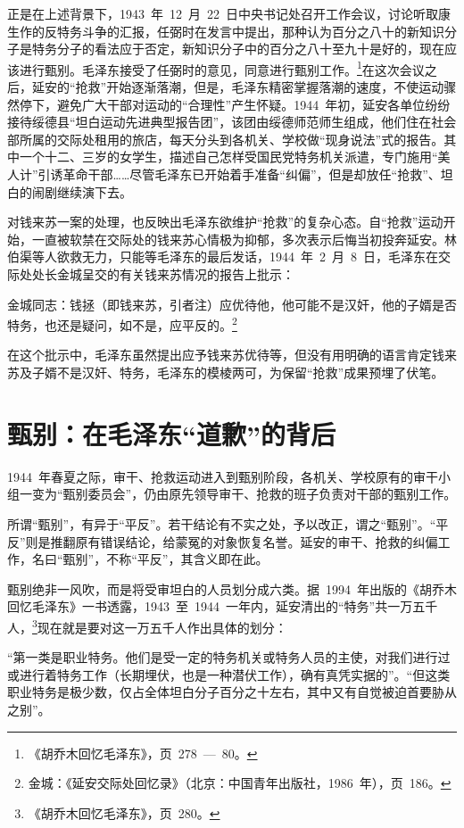正是在上述背景下，1943~年~12~月~22~日中央书记处召开工作会议，讨论听取康生作的反特务斗争的汇报，任弼时在发言中提出，那种认为百分之八十的新知识分子是特务分子的看法应于否定，新知识分子中的百分之八十至九十是好的，现在应该进行甄别。毛泽东接受了任弼时的意见，同意进行甄别工作。\footnote{《胡乔木回忆毛泽东》，页~278~—~80。}在这次会议之后，延安的“抢救”开始逐渐落潮，但是，毛泽东精密掌握落潮的速度，不使运动骤然停下，避免广大干部对运动的“合理性”产生怀疑。1944~年初，延安各单位纷纷接待绥德县“坦白运动先进典型报告团”，该团由绥德师范师生组成，他们住在社会部所属的交际处租用的旅店，每天分头到各机关、学校做“现身说法”式的报告。其中一个十二、三岁的女学生，描述自己怎样受国民党特务机关派遣，专门施用“美人计”引诱革命干部……尽管毛泽东已开始着手准备“纠偏”，但是却放任“抢救”、坦白的闹剧继续演下去。

对钱来苏一案的处理，也反映出毛泽东欲维护“抢救”的复杂心态。自“抢救”运动开始，一直被软禁在交际处的钱来苏心情极为抑郁，多次表示后悔当初投奔延安。林伯渠等人欲救无力，只能等毛泽东的最后发话，1944~年~2~月~8~日，毛泽东在交际处处长金城呈交的有关钱来苏情况的报告上批示：
\begin{quoting}
金城同志：钱拯（即钱来苏，引者注）应优待他，他可能不是汉奸，他的子婿是否特务，也还是疑问，如不是，应平反的。\footnote{金城：《延安交际处回忆录》（北京：中国青年出版社，1986~年），页~186。}
\end{quoting}

在这个批示中，毛泽东虽然提出应予钱来苏优待等，但没有用明确的语言肯定钱来苏及子婿不是汉奸、特务，毛泽东的模棱两可，为保留“抢救”成果预埋了伏笔。

\section{甄别：在毛泽东“道歉”的背后}

1944~年春夏之际，审干、抢救运动进入到甄别阶段，各机关、学校原有的审干小组一变为“甄别委员会”，仍由原先领导审干、抢救的班子负责对干部的甄别工作。

所谓“甄别”，有异于“平反”。若干结论有不实之处，予以改正，谓之“甄别”。“平反”则是推翻原有错误结论，给蒙冤的对象恢复名誉。延安的审干、抢救的纠偏工作，名曰“甄别”，不称“平反”，其含义即在此。

甄别绝非一风吹，而是将受审坦白的人员划分成六类。据~1994~年出版的《胡乔木回忆毛泽东》一书透露，1943~至~1944~一年内，延安清出的“特务”共一万五千人，\footnote{《胡乔木回忆毛泽东》，页~280。}现在就是要对这一万五千人作出具体的划分：

“第一类是职业特务。他们是受一定的特务机关或特务人员的主使，对我们进行过或进行着特务工作（长期埋伏，也是一种潜伏工作），确有真凭实据的”。“但这类职业特务是极少数，仅占全体坦白分子百分之十左右，其中又有自觉被迫首要胁从之别”。

